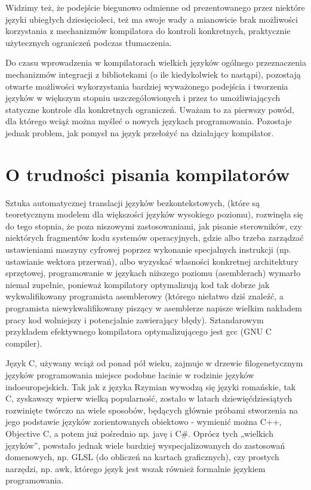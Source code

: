 Widzimy też, że podejście biegunowo odmienne od prezentowanego przez niektóre języki ubiegłych dziesięcioleci, też ma swoje wady a mianowicie brak możliwości korzystania z mechanizmów kompilatora do kontroli konkretnych, praktycznie użytecznych ograniczeń podczas tłumaczenia.

Do czasu wprowadzenia w kompilatorach wielkich języków ogólnego przeznaczenia mechanizmów integracji z bibliotekami (o ile kiedykolwiek to nastąpi), pozostają otwarte możliwości wykorzystania bardziej wyważonego podejścia i tworzenia języków w większym stopniu uszczegółowionych i przez to umożliwiających statyczne kontrole dla konkretnych ograniczeń. Uważam to za pierwszy powód, dla którego wciąż można myśleć o nowych językach programowania.
Pozostaje jednak problem, jak pomysł na język przełożyć na działający kompilator.

\section{O trudności pisania kompilatorów}
Sztuka automatycznej translacji języków bezkontekstowych, (które są teoretycznym modelem dla większości języków wysokiego poziomu), rozwinęła się do tego stopnia, że poza niszowymi zastosowaniami, jak pisanie sterowników, czy niektórych fragmentów kodu systemów operacyjnych, gdzie albo trzeba zarządzać ustawieniami maszyny cyfrowej poprzez wykonanie specjalnych instrukcji (np. ustawianie wektora przerwań), albo wyzyskać własności konkretnej architektury sprzętowej\cite{kernel_exception_handling}, programowanie w językach niższego poziomu (asemblerach) wymarło niemal zupełnie, ponieważ kompilatory optymalizują kod tak dobrze jak wykwalifikowany programista asemblerowy\cite{FORTRAN_AUTOMATIC_CODING_SYSTEM} (którego niełatwo dziś znaleźć, a programista niewykwalifikowany piszący w asemblerze napisze wielkim nakładem pracy kod wolniejszy i potencjalnie zawierający błędy). Sztandarowym przykładem efektywnego kompilatora optymalizującego jest gcc (GNU C compiler).%

Język C, używany wciąż od ponad pół wieku, zajmuje w drzewie filogenetycznym języków programowania miejsce podobne łacinie w rodzinie języków indoeuropejskich. Tak jak z języka Rzymian wywodzą się języki romańskie, tak C, zyskawszy wpierw wielką popularność, zostało w latach dziewięćdziesiątych rozwinięte twórczo na wiele sposobów, będących głównie próbami stworzenia na jego podstawie języków zorientowanych obiektowo - wymienić można C++, Objective C, a potem już pośrednio np. javę i C\#\cite{language_genealogical_tree_1, language_genealogical_tree_2}.
Oprócz tych „wielkich języków”, powstało jednak wiele bardziej wyspecjalizowanych do zastosowań domenowych, np. GLSL (do obliczeń na kartach graficznych)\cite{opengl_shading_language_460}, czy prostych narzędzi, np. awk\cite{awk_man}, którego język jest wszak również formalnie językiem programowania.

